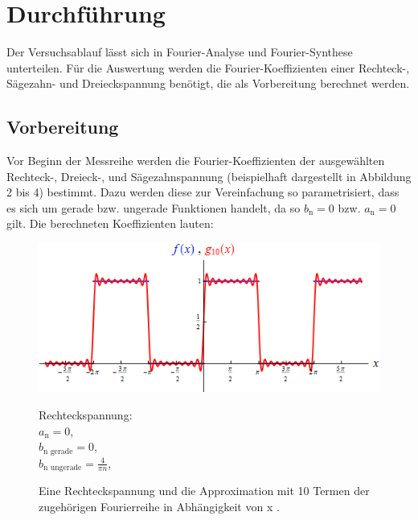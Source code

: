 \section{Durchführung}
\label{sec:Durchführung}
Der Versuchsablauf lässt sich in Fourier-Analyse und Fourier-Synthese unterteilen. Für die Auswertung werden die Fourier-Koeffizienten
einer Rechteck-, Sägezahn- und Dreieckspannung benötigt, die als Vorbereitung berechnet werden.

\subsection{Vorbereitung}
Vor Beginn der Messreihe werden die Fourier-Koeffizienten der ausgewählten Rechteck-,
Dreieck-, und Sägezahnspannung (beispielhaft dargestellt in Abbildung 2 bis 4) bestimmt. Dazu werden diese zur Vereinfachung so parametrisiert,
dass es sich um gerade bzw. ungerade Funktionen handelt, da so $b_\text{n} = 0$ bzw.
$a_\text{n} = 0$ gilt. Die berechneten Koeffizienten lauten:

\begin{figure}[H]
\hspace{73pt}
\begin{minipage}[t]{6cm}
\vspace{0pt}
\centering
\includegraphics[scale=0.5]{vorb1.png}
\caption{Eine Rechteckspannung und die Approximation mit 10 Termen der zugehörigen Fourierreihe in Abhängigkeit von x \cite{sample2}.}
\label{fig:vorb1}
\end{minipage}
\hfill
\hspace{73pt}
\begin{minipage}[t]{6cm}
\vspace{0pt}
Rechteckspannung: \\
$a_\text{n} = 0$, \\
$b_\text{n gerade} = 0$, \\
$b_\text{n ungerade} = \frac{4}{\pi n}$,
\end{minipage}
\end{figure}


